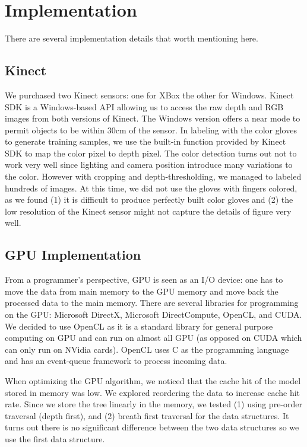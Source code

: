 \section{Implementation}
\label{sec: implementation}
\cutsection
There are several implementation details that worth mentioning here. 

\cutsection
\subsection{Kinect}
\cutsection

We purchased two Kinect sensors: one for XBox the other for Windows. Kinect SDK is a Windows-based API allowing us to access the raw depth and RGB images from both versions of Kinect. The Windows version offers a near mode to permit objects to be within 30cm of the sensor. In labeling with the color gloves to generate training samples, we use the built-in function provided by Kinect SDK to map the color pixel to depth pixel. The color detection turns out not to work very well since lighting and camera position introduce many variations to the color. However with cropping and depth-thresholding, we managed to labeled hundreds of images. At this time, we did not use the gloves with fingers colored, as we found (1) it is difficult to produce perfectly built color gloves and (2) the low resolution of the Kinect sensor might not capture the details of figure very well.

\cutsection
\subsection{GPU Implementation}
\cutsection

From a programmer's perspective, GPU is seen as an I/O device: one has to move the data from main memory to the GPU memory and move back the processed data to the main memory. There are several libraries for programming on the GPU: Microsoft DirectX, Microsoft DirectCompute, OpenCL, and CUDA. We decided to use OpenCL as it is a standard library for general purpose computing on GPU and can run on almost all GPU (as opposed on CUDA which can only run on NVidia cards). OpenCL uses C as the programming language and has an event-queue framework to process incoming data. 

When optimizing the GPU algorithm, we noticed that the cache hit of the model stored in memory was low. We explored reordering the data to increase cache hit rate. Since we store the tree linearly in the memory, we tested (1) using pre-order traversal (depth first), and (2) breath first traversal for the data structures. It turns out there is no significant difference between the two data structures so we use the first data structure.  

